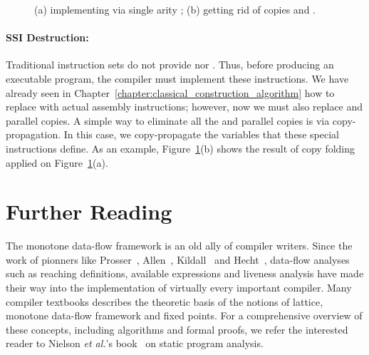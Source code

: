 \begin{figure}[t!]
\hspace{-1.2cm}\hspace{-0.6cm}
\caption{(a) implementing \sigmafuns via single arity \phifuns; (b) getting rid of copies and \sigmafuns.}
\label{fig:sigImpl}
\end{figure}

\paragraph{SSI Destruction: }
Traditional instruction sets do not provide \phifuns nor \sigmafuns.
Thus, before producing an executable program, the compiler must implement these instructions.
We have already seen in Chapter~\ref{chapter:classical_construction_algorithm} how to replace \phifuns with actual assembly instructions; however, now we must also replace \sigmafuns and parallel copies.
A simple way to eliminate all the \sigmafuns and parallel copies is via copy-propagation.
In this case, we copy-propagate the variables that these special instructions define.
As an example, Figure~\ref{fig:sigImpl}(b) shows the result of copy folding applied on Figure~\ref{fig:sigImpl}(a).

\section{Further Reading}

The monotone data-flow framework is an old ally of compiler writers.
Since the work of pionners like Prosser~\cite{Prosser59}, Allen~\cite{Allen70,Allen76}, Kildall~\cite{Kildall77} and Hecht~\cite{Hecht77}, data-flow analyses such as reaching definitions, available expressions and liveness analysis have made their way into the implementation of virtually every important compiler.
Many compiler textbooks describes the theoretic basis of the notions of lattice, monotone data-flow framework and fixed points.
For a comprehensive overview of these concepts, including algorithms and formal proofs, we refer the interested reader to Nielson {\em et al.}'s book~\cite{Nielson05} on static program analysis.

